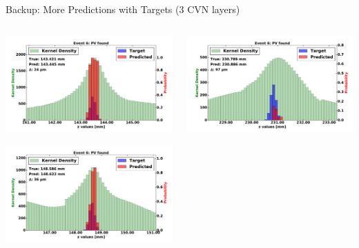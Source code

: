 \begin{frame}{Backup: More Predictions with Targets (3 CVN layers)}
  \begin{columns}[c]
        \begin{center}
            \includegraphics[width=1\textwidth,height=0.45\textwidth, trim=18 0 18 0]{images/120000_3layer_40.pdf}
    
            \includegraphics[width=1\textwidth, height=0.45\textwidth,trim=18 0 18 0]{images/120000_3layer_41.pdf}

        \end{center}
        \begin{center}
           \includegraphics[width=1\textwidth, height=0.45\textwidth, trim=18 0 18 0]{images/120000_3layer_42.pdf}
    

\end{center}
\end{columns}
\end{frame}
